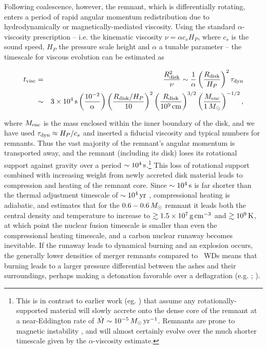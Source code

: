 Following coalescence, however, the remnant, which is differentially rotating, enters a period of rapid angular momentum redistribution due to hydrodynamically or magnetically-mediated viscosity.  Using the standard $\alpha$-viscosity prescription \citep{shaks73} -- i.e. the kinematic viscosity $\nu = \alpha c_s H_P$, where $c_s$ is the sound speed, $H_P$ the pressure scale height and $\alpha$ a tunable parameter -- the timescale for viscous evolution can be estimated as \citep{shen+12}

\begin{eqnarray}
t_\mrm{visc} &=& \frac{R_\mrm{disk}^2}{\nu} \sim \frac{1}{\alpha}\left(\frac{R_\mrm{disk}}{H_P}\right)^2\taudyn \nonumber \\
			&\sim& 3\times10^4\,\mrm{s}\left(\frac{10^{-2}}{\alpha}\right)\left(\frac{R_\mrm{disk}/H_P}{10}\right)^2\left(\frac{R_\mrm{disk}}{10^9\,\mrm{cm}}\right)^{3/2}\left(\frac{M_\mrm{enc}}{1\,\Msun}\right)^{-1/2},
\end{eqnarray}

\noindent where $M_\mathrm{enc}$ is the mass enclosed within the inner boundary of the disk, and we have used $\taudyn \approx H_P/c_s$ and inserted a fiducial viscosity and typical numbers for remnants.  Thus the vast majority of the remnant's angular momentum is transported away, and the remnant (including its disk) loses its rotational support against gravity over a period $\sim10^4\,\mathrm{s}$.\footnote{This is in contrast to earlier work (eg. \citealt{nomoi85, yoonpr07}) that assume any rotationally-supported material will slowly accrete onto the dense core of the remnant at a near-Eddington rate of $\dot{M} \sim 10^{-5}\,\Msun\,\pyr$.  Remnants are prone to magnetic instability \citep{shen+12,ji+13}, and will almost certainly evolve over the much shorter timescale given by the $\alpha$-viscosity estimate.}  This loss of rotational support combined with increasing weight from newly accreted disk material leads to compression and heating of the remnant core.  Since $\sim10^4\,\mathrm{s}$ is far shorter than the thermal adjustment timescale of $\sim10^4\,\mathrm{yr}$ \citep{shen+12}, compressional heating is adiabatic, and \citeal{vkercj10} estimates that for the $0.6-0.6\,\Msun$ remnant it leads both the central density and temperature to increase to $\gtrsim1.5\times10^7\,\gcc$ and $\gtrsim10^9\,\mathrm{K}$, at which point the nuclear fusion timescale is smaller than even the compressional heating timescale, and a carbon nuclear runaway becomes inevitable.  If the runaway leads to dynamical burning and an explosion occurs, the generally lower densities of merger remnants compared to \Mch\ WDs means that burning leads to a larger pressure differential between the ashes and their surroundings, perhaps making a detonation favorable over a deflagration (e.g. \citealt{mazumw77}; \citealt{seit+09}).

